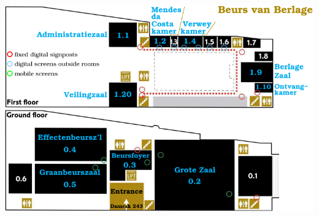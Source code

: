 

~
\vfill
\includegraphics[width=.95\textheight,angle=90]{images/BvB-plan-2D-85mm-x-128mm-right.pdf}%

